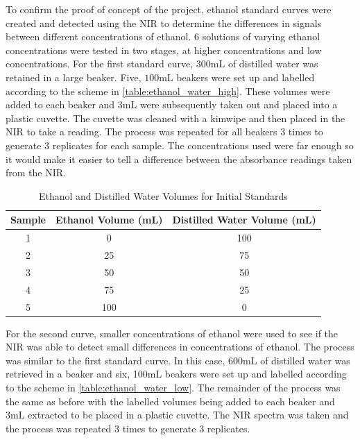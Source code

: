 \documentclass[12pt]{report}
\begin{document}
To confirm the proof of concept of the project, ethanol standard curves were created and detected using the NIR to determine the differences in signals between different concentrations of ethanol. $6$ solutions of varying ethanol concentrations were tested in two stages, at higher concentrations and low concentrations. For the first standard curve, $300\text{mL}$ of distilled water was retained in a large beaker. Five, $100\text{mL}$ beakers were set up and labelled according to the scheme in \autoref{table:ethanol_water_high}. These volumes were added to each beaker and 3mL were subsequently taken out and placed into a plastic cuvette. The cuvette was cleaned with a kimwipe and then placed in the NIR to take a reading. The process was repeated for all beakers 3 times to generate 3 replicates for each sample. The concentrations used were far enough so it would make it easier to tell a difference between the absorbance readings taken from the NIR.

\begin{table}[!h]
    \centering
    \begin{tabular}{c c c}
    \toprule
    Sample & Ethanol Volume (mL) & Distilled Water Volume (mL) \\
    \midrule
    1 & 0   & 100 \\
    2 & 25  & 75  \\
    3 & 50  & 50  \\
    4 & 75  & 25  \\
    5 & 100 & 0   \\
    \bottomrule
    \end{tabular}
    \caption{Ethanol and Distilled Water Volumes for Initial Standards}
    \label{table:ethanol_water_high}
    \end{table}

For the second curve, smaller concentrations of ethanol were used to see if the NIR was able to detect small differences in concentrations of ethanol. The process was similar to the first standard curve. In this case, $600\text{mL}$ of distilled water was retrieved in a beaker and six, 100mL beakers were set up and labelled according to the scheme in \autoref{table:ethanol_water_low}. The remainder of the process was the same as before with the labelled volumes being added to each beaker and $3\text{mL}$ extracted to be placed in a plastic cuvette. The NIR spectra was taken and the process was repeated 3 times to generate 3 replicates. 
\end{document}
